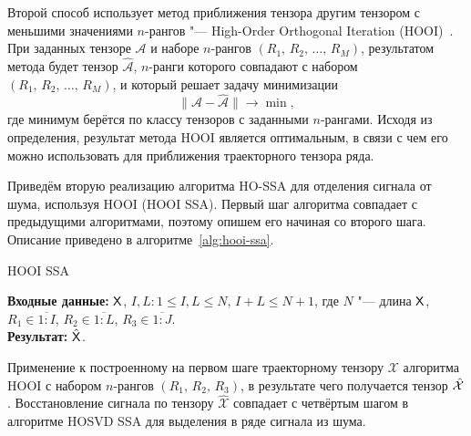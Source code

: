 \documentclass[specialist,
    substylefile = spbu_report.rtx,
    subf,href,colorlinks=true, 12pt]{disser}
\theoremstyle{plain}
\theoremstyle{definition}
\theoremstyle{remark}
\newcommand{\Input}{\textbf{Входные данные: }}
\newcommand{\Output}{\textbf{Результат: }}
\begin{document}
    Второй способ использует метод приближения тензора другим тензором с меньшими значениями $n$-рангов "--- High-Order Orthogonal
    Iteration (HOOI)~\cite{hooi}.
    При заданных тензоре $\mathcal{A}$ и наборе $n$-рангов $(R_1,\, R_2,\, \ldots,\, R_M)$, результатом метода будет
    тензор $\hat{\mathcal{A}}$, $n$-ранги которого совпадают с набором $(R_1,\, R_2,\, \ldots,\, R_M)$, и который решает
    задачу минимизации
    \[
        \|\mathcal{A}-\hat{\mathcal{A}}\|\to \min,
    \]
    где минимум берётся по классу тензоров с заданными $n$-рангами.
    Исходя из определения, результат метода HOOI является оптимальным, в связи с чем его можно использовать
    для приближения траекторного тензора ряда.

    Приведём вторую реализацию алгоритма HO-SSA для отделения сигнала от шума, используя HOOI (HOOI SSA).
    Первый шаг алгоритма совпадает с предыдущими алгоритмами, поэтому опишем его начиная со второго шага.
    Описание приведено в алгоритме~\ref{alg:hooi-ssa}.

    \begin{algorithm}
        \caption{HOOI SSA}
        \label{alg:hooi-ssa}
        \Input $\mathsf{X}$, $I,L: 1\leqslant I,L \leqslant N,\, I + L \leqslant N + 1$, где $N$ "--- длина $\mathsf{X}$, $R_1 \in \overline{1:I}$,
        $R_2 \in \overline{1:L}$, $R_3 \in \overline{1:J}$.\\
        \Output $\hat{\mathsf{X}}$.

        \begin{algorithmic}[1]
            \State Применение к построенному на первом шаге траекторному тензору $\mathcal{X}$ алгоритма
            HOOI с набором $n$-рангов $(R_1,\, R_2,\, R_3)$, в результате чего получается тензор $\hat{\mathcal{X}}$.
            \State Восстановление сигнала по тензору $\hat{\mathcal{X}}$ совпадает с четвёртым шагом в
            алгоритме HOSVD SSA для выделения в ряде сигнала из шума.
        \end{algorithmic}
    \end{algorithm}
\end{document}
